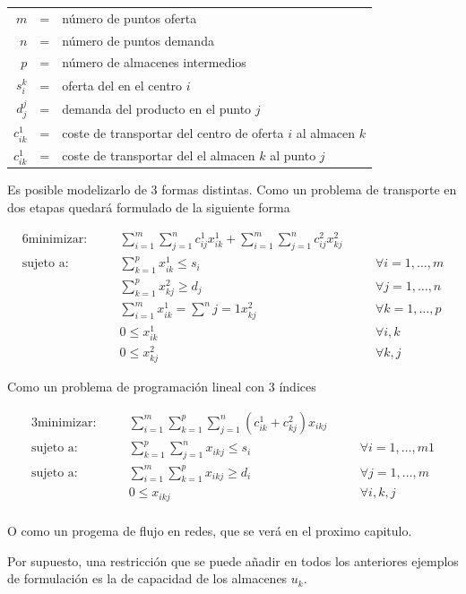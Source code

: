\begin{center}
    \begin{tabular}{rcl}
        $m$         & = & número de puntos oferta \\
        $n$         & = & número de puntos demanda \\
        $p$         & = & número de almacenes intermedios \\
        $s_i^k$     & = & oferta del en el centro $i$ \\
        $d_j^j$     & = & demanda del producto en el punto $j$ \\
        $c_{ik}^1$  & = & coste de transportar del centro de oferta $i$ al almacen $k$ \\
        $c_{ik}^1$  & = & coste de transportar del el almacen $k$ al punto $j$ \\
    \end{tabular}
\end{center}

Es posible modelizarlo de 3 formas distintas. Como un problema de transporte en dos etapas quedará formulado de la siguiente
forma

\begin{alignat}{6}
    \text{minimizar:}   & \quad & \sum^m_{i=1}\sum^n_{j=1}c_{ij}^1x_{ik}^1 + \sum^m_{i=1}\sum^n_{j=1}c_{ij}^2x_{kj}^2 & \quad &                        \\
    \text{sujeto a:}    & \quad & \sum^p_{k=1}x_{ik}^1\leq s_i  &               & \forall i=1,\dots,m           \\
                        & \quad & \sum^p_{k=1}x_{kj}^2\geq d_j  &               & \forall j=1,\dots,n           \\
                        & \quad & \sum^m_{i=1}x_{ik}^1 = \sum^n{j=1}x_{kj}^2    &       & \forall k=1,\dots,p   \\
                        & \quad & 0 \leq x_{ik}^1                               &       & \forall i,k           \\
                        & \quad & 0 \leq x_{kj}^2                               &       & \forall k,j
\end{alignat}

Como un problema de programación lineal con 3 índices

\begin{alignat}{3}
    \text{minimizar:}   & \quad & \sum^m_{i=1}\sum^p_{k=1}\sum^n_{j=1}(c_{ik}^1 + c_{kj}^2)x_{ikj}  & \quad &   \\
    \text{sujeto a:}    & \quad & \sum^p_{k=1}\sum^n_{j=1}x_{ikj}\leq s_i   &      & \forall i=1,\dots,m1       \\
    \text{sujeto a:}    & \quad & \sum^m_{i=1}\sum^p_{k=1}x_{ikj}\geq d_i   &      & \forall j=1,\dots,m        \\
                        & \quad & 0 \leq x_{ikj}                            &      & \forall i,k,j              \\
\end{alignat}

O como un progema de flujo en redes, que se verá en el proximo capitulo.

\vspace*{5mm}

\noindent Por supuesto, una restricción que se puede añadir en todos los anteriores ejemplos de formulación es la de 
capacidad de los almacenes $u_k$.